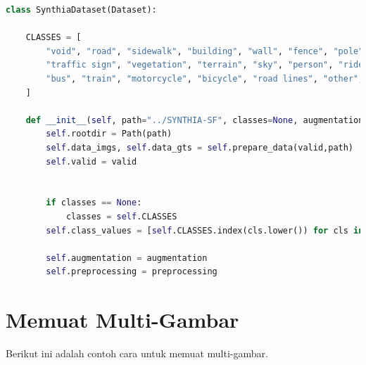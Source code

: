\documentclass[11pt,a4paper]{article}
\begin{document}
    \begin{lstlisting}[language=Python, caption=Captionnya tulis di sini class,label={labelkode}]
    class SynthiaDataset(Dataset):

    CLASSES = [
        "void", "road", "sidewalk", "building", "wall", "fence", "pole", "traffic light", 
        "traffic sign", "vegetation", "terrain", "sky", "person", "rider", "car", "truck", 
        "bus", "train", "motorcycle", "bicycle", "road lines", "other", "road works"
    ]
    
    def __init__(self, path="../SYNTHIA-SF", classes=None, augmentation=None, preprocessing=None, valid=False):
        self.rootdir = Path(path)
        self.data_imgs, self.data_gts = self.prepare_data(valid,path)
        self.valid = valid

    
        if classes == None:
            classes = self.CLASSES 
        self.class_values = [self.CLASSES.index(cls.lower()) for cls in classes]
        
        self.augmentation = augmentation
        self.preprocessing = preprocessing
    \end{lstlisting}

\section{Memuat Multi-Gambar}
Berikut ini adalah contoh cara untuk memuat multi-gambar.
\end{document}
